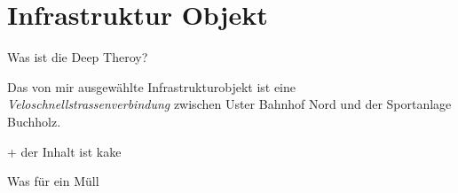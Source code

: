 %
%
%
%

\chapter{Infrastruktur Objekt}
\label{chap:background}

Was ist die Deep Theroy?

Das von mir ausgewählte Infrastrukturobjekt ist eine \textit{Veloschnellstrassenverbindung} zwischen Uster Bahnhof Nord und der Sportanlage Buchholz.

+ der Inhalt ist kake

\blindtext \newline

Was für ein Müll


%

